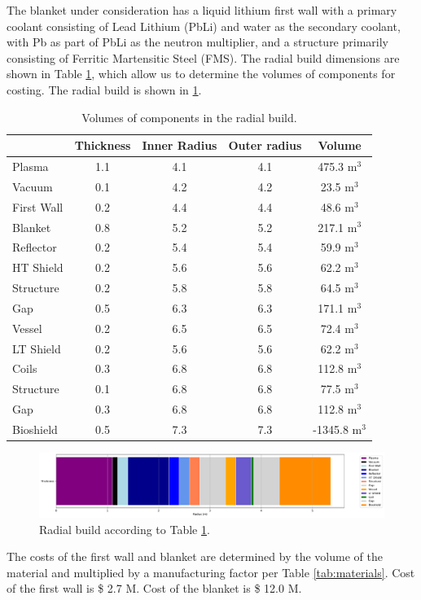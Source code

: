 The blanket under consideration has a liquid lithium first wall with a primary coolant consisting of Lead Lithium (PbLi) and water as the secondary coolant, with Pb as part of PbLi as the neutron multiplier, and a structure primarily consisting of Ferritic Martensitic Steel (FMS). The radial build dimensions are shown in Table \ref{tab:volumes}, which allow us to determine the volumes of components for costing.  The radial build is shown in \ref{fig:radial}.  \\


\begin{table}[h!]
    \centering
    \begin{tabular}{l c  c c c}
    \hline
        &	Thickness	&	Inner Radius	&	Outer radius	&	Volume		\\
        \hline
Plasma	&	1.1	&	4.1	&	4.1	&	475.3	m$^{3}$	\\
Vacuum	&	0.1	&	4.2	&	4.2	&	23.5	m$^{3}$	\\
First Wall	&	0.2	&	4.4	&	4.4	&	48.6	m$^{3}$	\\
Blanket	&	0.8	&	5.2	&	5.2	&	217.1	m$^{3}$	\\
Reflector	&	0.2	&	5.4	&	5.4	&	59.9	m$^{3}$	\\
HT Shield	&	0.2	&	5.6	&	5.6	&	62.2	m$^{3}$	\\
Structure	&	0.2	&	5.8	&	5.8	&	64.5	m$^{3}$	\\
Gap	&	0.5	&	6.3	&	6.3	&	171.1	m$^{3}$	\\
Vessel	&	0.2	&	6.5	&	6.5	&	72.4	m$^{3}$	\\
LT Shield	&	0.2	&	5.6	&	5.6	&	62.2	m$^{3}$	\\
Coils	&	0.3	&	6.8	&	6.8	&	112.8	m$^{3}$	\\
Structure	&	0.1	&	6.8	&	6.8	&	77.5	m$^{3}$	\\
Gap	&	0.3	&	6.8	&	6.8	&	112.8	m$^{3}$	\\
Bioshield	&	0.5	&	7.3	&	7.3	&	-1345.8	m$^{3}$	\\

        \hline
    \end{tabular}
    \caption{Volumes of components in the radial build.}
    \label{tab:volumes}
\end{table}

\begin{figure}
    \centering
    \includegraphics[width=0.9\linewidth]{Figures/radial_build.pdf}
    \caption{Radial build according to Table \ref{tab:volumes}.}
    \label{fig:radial}
\end{figure}



The costs of the first wall and blanket are determined by the volume of the material and multiplied by a manufacturing factor per Table \ref{tab:materials}.   Cost of the first wall is \$ 2.7 M.  Cost of the blanket is \$ 12.0 M.

